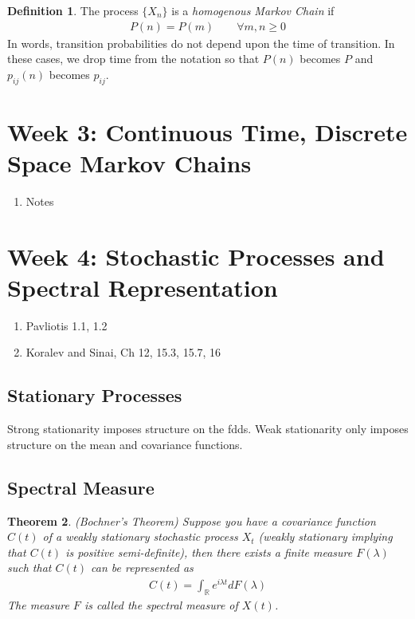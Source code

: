 \documentclass[12pt]{article}
\theoremstyle{plain}
\newtheorem{thm}{Theorem}[section]
\theoremstyle{definition}
\newtheorem{defn}[thm]{Definition}
\theoremstyle{remark}
\begin{document}
\begin{defn}
The process $\{X_n\}$ is a \emph{homogenous Markov Chain} if
\begin{align*}
  P(n) = P(m) \qquad \forall m,n\geq 0
\end{align*}
In words, transition probabilities do not depend upon the time of
transition. In these cases, we drop time from the notation so that
$P(n)$ becomes $P$ and $p_{ij}(n)$ becomes $p_{ij}$.
\end{defn}



\section{Week 3: Continuous Time, Discrete Space Markov Chains}

\begin{enumerate}
  \item Notes
\end{enumerate}

\section{Week 4: Stochastic Processes and Spectral Representation}

\begin{enumerate}
  \item Pavliotis 1.1, 1.2
  \item Koralev and Sinai, Ch 12, 15.3, 15.7, 16
\end{enumerate}

\subsection{Stationary Processes}

Strong stationarity imposes structure on the fdds. Weak stationarity
only imposes structure on the mean and covariance functions.

\subsection{Spectral Measure}

\begin{thm}\emph{(Bochner's Theorem)}
Suppose you have a covariance function $C(t)$ of a weakly stationary
stochastic process $X_t$ (weakly stationary implying that $C(t)$ is
positive semi-definite), then there exists a finite measure $F(\lambda)$
such that $C(t)$ can be represented as
\begin{align*}
  C(t) = \int_\mathbb{R} e^{i\lambda t} dF(\lambda)
\end{align*}
The measure $F$ is called the \emph{spectral measure} of $X(t)$.
\end{thm}
\end{document}
